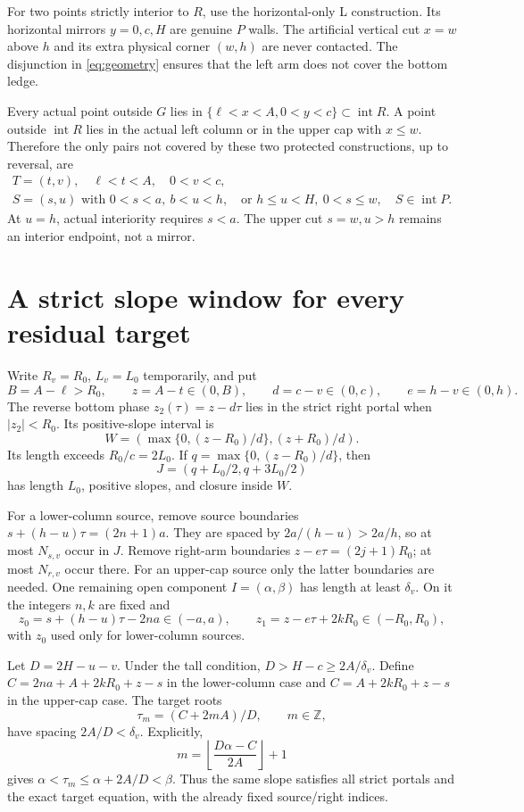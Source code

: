 \documentclass[11pt]{article}
\theoremstyle{definition}
\newcommand{\Z}{\mathbb Z}
\newcommand{\intr}{\operatorname{int}}
\begin{document}
For two points strictly interior to $R$, use the horizontal-only L construction. Its horizontal mirrors $y=0,c,H$ are genuine $P$ walls. The artificial vertical cut $x=w$ above $h$ and its extra physical corner $(w,h)$ are never contacted. The disjunction in \eqref{eq:geometry} ensures that the left arm does not cover the bottom ledge.

Every actual point outside $G$ lies in $\{\ell<x<A,0<y<c\}\subset\intr R$. A point outside $\intr R$ lies in the actual left column or in the upper cap with $x\le w$. Therefore the only pairs not covered by these two protected constructions, up to reversal, are
\begin{gather}\label{eq:residual}
 T=(t,v),\quad\ell<t<A,\quad0<v<c,\\
 S=(s,u)\text{ with }0<s<a,\ b<u<h,
 \quad\text{or }h\le u<H,\ 0<s\le w,
 \quad S\in\intr P.\nonumber
\end{gather}
At $u=h$, actual interiority requires $s<a$. The upper cut $s=w,u>h$ remains an interior endpoint, not a mirror.

\section{A strict slope window for every residual target}
Write $R_v=R_0$, $L_v=L_0$ temporarily, and put
\[
 B=A-\ell>R_0,\qquad z=A-t\in(0,B),\qquad d=c-v\in(0,c),\qquad e=h-v\in(0,h).
\]
The reverse bottom phase $z_2(\tau)=z-d\tau$ lies in the strict right portal when $|z_2|<R_0$. Its positive-slope interval is
\[
 W=\left(\max\{0,(z-R_0)/d\},(z+R_0)/d\right).
\]
Its length exceeds $R_0/c=2L_0$. If $q=\max\{0,(z-R_0)/d\}$, then
\[
 J=(q+L_0/2,q+3L_0/2)
\]
has length $L_0$, positive slopes, and closure inside $W$.

For a lower-column source, remove source boundaries $s+(h-u)\tau=(2n+1)a$. They are spaced by $2a/(h-u)>2a/h$, so at most $N_{s,v}$ occur in $J$. Remove right-arm boundaries $z-e\tau=(2j+1)R_0$; at most $N_{r,v}$ occur there. For an upper-cap source only the latter boundaries are needed. One remaining open component $I=(\alpha,\beta)$ has length at least $\delta_v$. On it the integers $n,k$ are fixed and
\[
 z_0=s+(h-u)\tau-2na\in(-a,a),\qquad
 z_1=z-e\tau+2kR_0\in(-R_0,R_0),
\]
with $z_0$ used only for lower-column sources.

Let $D=2H-u-v$. Under the tall condition, $D>H-c\ge2A/\delta_v$. Define $C=2na+A+2kR_0+z-s$ in the lower-column case and $C=A+2kR_0+z-s$ in the upper-cap case. The target roots
\[
 \tau_m=(C+2mA)/D,\qquad m\in\Z,
\]
have spacing $2A/D<\delta_v$. Explicitly,
\[
 m=\left\lfloor\frac{D\alpha-C}{2A}\right\rfloor+1
\]
gives $\alpha<\tau_m\le\alpha+2A/D<\beta$. Thus the same slope satisfies all strict portals and the exact target equation, with the already fixed source/right indices.
\end{document}
